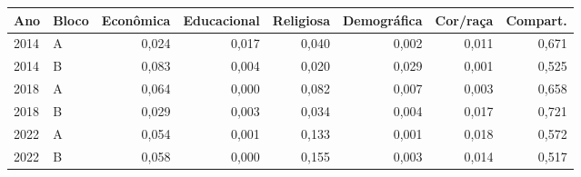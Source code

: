 \begin{tabular}{llrrrrrr}
\toprule
Ano & Bloco & Econômica & Educacional & Religiosa & Demográfica & Cor/raça & Compart. \\
\midrule
2014 & A & 0{,}024 & 0{,}017 & 0{,}040 & 0{,}002 & 0{,}011 & 0{,}671 \\
2014 & B & 0{,}083 & 0{,}004 & 0{,}020 & 0{,}029 & 0{,}001 & 0{,}525 \\
2018 & A & 0{,}064 & 0{,}000 & 0{,}082 & 0{,}007 & 0{,}003 & 0{,}658 \\
2018 & B & 0{,}029 & 0{,}003 & 0{,}034 & 0{,}004 & 0{,}017 & 0{,}721 \\
2022 & A & 0{,}054 & 0{,}001 & 0{,}133 & 0{,}001 & 0{,}018 & 0{,}572 \\
2022 & B & 0{,}058 & 0{,}000 & 0{,}155 & 0{,}003 & 0{,}014 & 0{,}517 \\
\bottomrule
\end{tabular}
